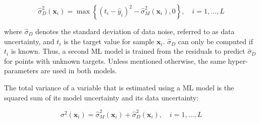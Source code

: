 \begin{equation}
\label{eq:data_unc}
  \hat{\sigma}_D^2 (\mathbf{x}_i) = \max \left\{ (t_i - \hat{y}_i)^2 - \hat{\sigma}_M^2 (\mathbf{x}_i) , 0 \right\}, \quad i=1,...,L
\end{equation}
 
 where $\hat{\sigma}_D$ denotes the standard deviation of data noise, referred to as data uncertainty, and $t_i$ is the target value for sample $\mathbf{x}_i$. 
$\hat{\sigma}_D$ can only be computed if $t_i$ is known. Thus, a second ML model is trained from the residuals to predict $\hat{\sigma}_D$ for points with unknown targets. Unless mentioned otherwise, the same hyper-parameters are used in both models.

The total variance of a variable that is estimated using a ML model is the squared sum of its model uncertainty and its data uncertainty: 

\begin{equation}
\label{eq:total_unc}
\sigma^2 (\mathbf{x}_i) = \hat{\sigma}_M^2 (\mathbf{x}_i) + \hat{\sigma}_D^2 (\mathbf{x}_i), \quad i=1,...,L
\end{equation}

